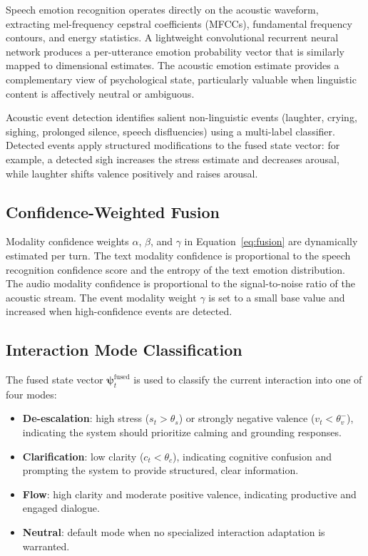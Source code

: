 \documentclass[conference]{IEEEtran}
\begin{document}
Speech emotion recognition operates directly on the acoustic waveform, extracting mel-frequency cepstral coefficients (MFCCs), fundamental frequency contours, and energy statistics. A lightweight convolutional recurrent neural network produces a per-utterance emotion probability vector that is similarly mapped to dimensional estimates. The acoustic emotion estimate provides a complementary view of psychological state, particularly valuable when linguistic content is affectively neutral or ambiguous.

Acoustic event detection identifies salient non-linguistic events (laughter, crying, sighing, prolonged silence, speech disfluencies) using a multi-label classifier. Detected events apply structured modifications to the fused state vector: for example, a detected sigh increases the stress estimate and decreases arousal, while laughter shifts valence positively and raises arousal.

\subsection{Confidence-Weighted Fusion}

Modality confidence weights $\alpha$, $\beta$, and $\gamma$ in Equation~\eqref{eq:fusion} are dynamically estimated per turn. The text modality confidence is proportional to the speech recognition confidence score and the entropy of the text emotion distribution. The audio modality confidence is proportional to the signal-to-noise ratio of the acoustic stream. The event modality weight $\gamma$ is set to a small base value and increased when high-confidence events are detected.

\subsection{Interaction Mode Classification}

The fused state vector $\boldsymbol{\psi}^{\text{fused}}_t$ is used to classify the current interaction into one of four modes:

\begin{itemize}
    \item \textbf{De-escalation}: high stress ($s_t > \theta_s$) or strongly negative valence ($v_t < \theta_v^-$), indicating the system should prioritize calming and grounding responses.
    \item \textbf{Clarification}: low clarity ($c_t < \theta_c$), indicating cognitive confusion and prompting the system to provide structured, clear information.
    \item \textbf{Flow}: high clarity and moderate positive valence, indicating productive and engaged dialogue.
    \item \textbf{Neutral}: default mode when no specialized interaction adaptation is warranted.
\end{itemize}
\end{document}
